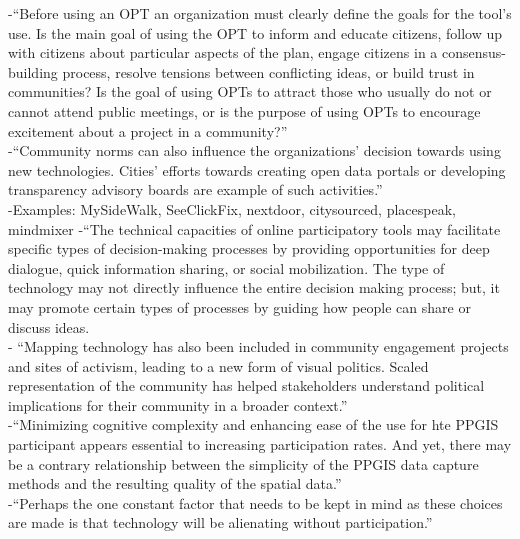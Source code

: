 -{\color{orange}“Before using an OPT an organization must clearly define the goals for the tool’s use. Is the main goal of using the OPT to inform and educate citizens, follow up with citizens about particular aspects of the plan, engage citizens in a consensus-building process, resolve tensions between conflicting ideas, or build trust in communities? Is the goal of using OPTs to attract those who usually do not or cannot attend public meetings, or is the purpose of using OPTs to encourage excitement about a project in a community?”}\cite{Afzalan2017}\\
-{\color{orange}“Community norms can also influence the organizations’ decision towards using new technologies. Cities’ efforts towards creating open data portals or developing transparency advisory boards are example of such activities.” }\cite{Afzalan2017}\\
-Examples: MySideWalk, SeeClickFix, nextdoor, citysourced, placespeak, mindmixer \cite{Afzalan2017}
-{\color{orange}“The technical capacities of online participatory tools may facilitate specific types of decision-making processes by providing opportunities for deep dialogue, quick information sharing, or social mobilization. The type of technology may not directly influence the entire decision making process; but, it may promote certain types of processes by guiding how people can share or discuss ideas.}\cite{Afzalan2017}\\
-{\color{orange} “Mapping technology has also been included in community engagement projects and sites of activism, leading to a new form of visual politics. Scaled representation of the community has helped stakeholders understand political implications for their community in a broader context.”\cite{McQueenBaker2019}}\\
-{\color{orange}“Minimizing cognitive complexity and enhancing ease of the use for hte PPGIS participant appears essential to increasing participation rates. And yet, there may be a contrary relationship between the simplicity of the PPGIS data capture methods and the resulting quality of the spatial data.”\cite{Brown2012}}\\
-{\color{orange}“Perhaps the one constant factor that needs to be kept in mind as these choices are made is that technology will be alienating without participation.”\cite{Williams2016}}\\

